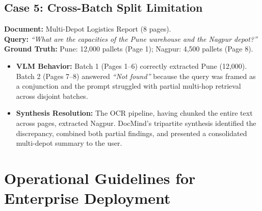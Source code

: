 \documentclass[conference]{IEEEtran}
\begin{document}
{\subsection{Case 5: Cross-Batch Split Limitation}
\textbf{Document:} Multi-Depot Logistics Report (8 pages). \\
\textbf{Query:} \textit{``What are the capacities of the Pune warehouse and the Nagpur depot?''} \\
\textbf{Ground Truth:} Pune: 12,000 pallets (Page 1); Nagpur: 4,500 pallets (Page 8).
\begin{itemize}
    \item \textbf{VLM Behavior:} Batch 1 (Pages 1--6) correctly extracted Pune (12,000). Batch 2 (Pages 7--8) answered \textit{``Not found''} because the query was framed as a conjunction and the prompt struggled with partial multi-hop retrieval across disjoint batches.
    \item \textbf{Synthesis Resolution:} The OCR pipeline, having chunked the entire text across pages, extracted Nagpur. DocMind's tripartite synthesis identified the discrepancy, combined both partial findings, and presented a consolidated multi-depot summary to the user.
\end{itemize}

\section{Operational Guidelines for Enterprise Deployment}

}
\end{document}
